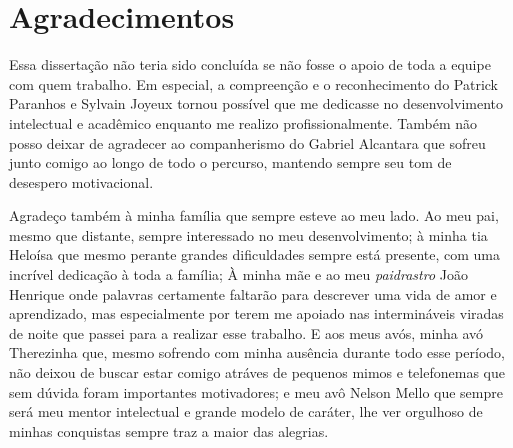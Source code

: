 \chapter*{Agradecimentos}

Essa dissertação não teria sido concluída se não fosse o apoio de toda a equipe
com quem trabalho. Em especial, a compreenção e o reconhecimento %
do Patrick Paranhos e Sylvain Joyeux tornou possível que me dedicasse no
desenvolvimento intelectual e acadêmico enquanto me realizo profissionalmente.
Também não posso deixar de agradecer ao companherismo do Gabriel Alcantara que sofreu
junto comigo ao longo de todo o percurso, mantendo sempre seu tom de desespero
motivacional.


Agradeço também à minha família que sempre esteve ao meu lado. Ao meu pai, mesmo
que distante, sempre interessado no meu desenvolvimento; à minha tia Heloísa que
mesmo perante grandes dificuldades sempre está presente, com uma incrível
dedicação à toda a família; À minha mãe e ao meu \textit{paidrastro} João
Henrique onde palavras certamente faltarão para descrever uma vida de amor e aprendizado,
mas especialmente por terem me apoiado nas intermináveis viradas de noite
que passei para a realizar esse trabalho. E aos meus avós, minha avó
Therezinha que, mesmo sofrendo com minha ausência durante todo esse período, não deixou de buscar
estar comigo atráves de pequenos mimos e telefonemas que sem dúvida foram
importantes motivadores; e meu avô Nelson Mello que sempre será meu mentor
intelectual e grande modelo de caráter, lhe ver orgulhoso de minhas conquistas
sempre traz a maior das alegrias.
